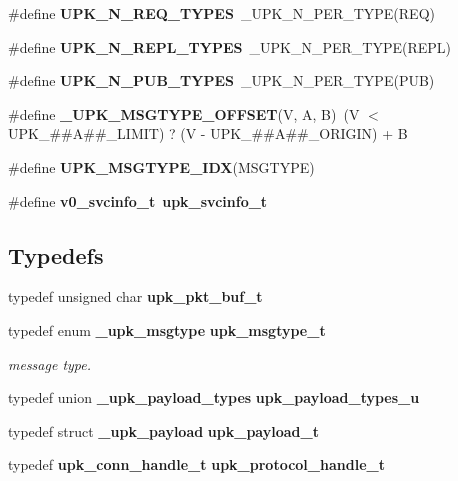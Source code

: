 \begin{DoxyCompactItemize}
\item 
\#define {\bf UPK\_\-N\_\-REQ\_\-TYPES}~\_\-UPK\_\-N\_\-PER\_\-TYPE(REQ)
\item 
\#define {\bf UPK\_\-N\_\-REPL\_\-TYPES}~\_\-UPK\_\-N\_\-PER\_\-TYPE(REPL)
\item 
\#define {\bf UPK\_\-N\_\-PUB\_\-TYPES}~\_\-UPK\_\-N\_\-PER\_\-TYPE(PUB)
\item 
\#define {\bf \_\-UPK\_\-MSGTYPE\_\-OFFSET}(V, A, B)~(V $<$ UPK\_\-\#\#A\#\#\_\-LIMIT) ? (V -\/ UPK\_\-\#\#A\#\#\_\-ORIGIN) + B
\item 
\#define {\bf UPK\_\-MSGTYPE\_\-IDX}(MSGTYPE)
\item 
\#define {\bf v0\_\-svcinfo\_\-t}~{\bf upk\_\-svcinfo\_\-t}
\end{DoxyCompactItemize}
\subsection*{Typedefs}
\begin{DoxyCompactItemize}
\item 
typedef unsigned char {\bf upk\_\-pkt\_\-buf\_\-t}
\item 
typedef enum {\bf \_\-upk\_\-msgtype} {\bf upk\_\-msgtype\_\-t}
\begin{DoxyCompactList}\small\item\em message type. \end{DoxyCompactList}\item 
typedef union {\bf \_\-upk\_\-payload\_\-types} {\bf upk\_\-payload\_\-types\_\-u}
\item 
typedef struct {\bf \_\-upk\_\-payload} {\bf upk\_\-payload\_\-t}
\item 
typedef {\bf upk\_\-conn\_\-handle\_\-t} {\bf upk\_\-protocol\_\-handle\_\-t}
\end{DoxyCompactItemize}
